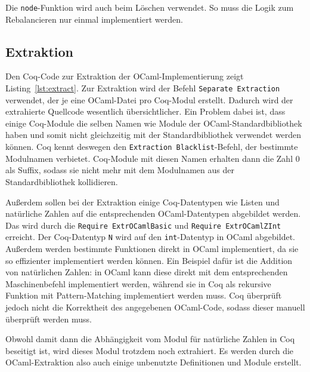 \documentclass[a4paper, parskip]{scrartcl}
\begin{document}
Die \verb|node|-Funktion wird auch beim Löschen verwendet.
So muss die Logik zum Rebalancieren nur einmal implementiert werden.

\subsection{Extraktion}

Den Coq-Code zur Extraktion der OCaml-Implementierung zeigt Listing~\ref{lst:extract}. 
Zur Extraktion wird der Befehl \verb|Separate Extraction| verwendet, der je eine OCaml-Datei pro Coq-Modul erstellt.
Dadurch wird der extrahierte Quellcode wesentlich übersichtlicher.
Ein Problem dabei ist, dass einige Coq-Module die selben Namen wie Module der OCaml-Standardbibliothek haben und somit nicht gleichzeitig mit der Standardbibliothek verwendet werden können.
Coq kennt deswegen den \verb|Extraction Blacklist|-Befehl, der bestimmte Modulnamen verbietet.
Coq-Module mit diesen Namen erhalten dann die Zahl 0 als Suffix, sodass sie nicht mehr mit dem Modulnamen aus der Standardbibliothek kollidieren.

Außerdem sollen bei der Extraktion einige Coq-Datentypen wie Listen und natürliche Zahlen auf die entsprechenden OCaml-Datentypen abgebildet werden.
Das wird durch die \verb|Require ExtrOCamlBasic| und \verb|Require ExtrOCamlZInt| erreicht. Der Coq-Datentyp \verb|N| wird auf den \verb|int|-Datentyp in OCaml abgebildet.
Außerdem werden bestimmte Funktionen direkt in OCaml implementiert, da sie so effizienter implementiert werden können. 
Ein Beispiel dafür ist die Addition von natürlichen Zahlen: in OCaml kann diese direkt mit dem entsprechenden Maschinenbefehl implementiert werden, während sie in Coq als rekursive Funktion mit Pattern-Matching implementiert werden muss. Coq überprüft jedoch nicht die Korrektheit des angegebenen OCaml-Code, sodass dieser manuell überprüft werden muss. 

Obwohl damit dann die Abhängigkeit vom Modul für natürliche Zahlen in Coq beseitigt ist, wird dieses Modul trotzdem noch extrahiert. Es werden durch die OCaml-Extraktion also auch einige unbenutzte Definitionen und Module erstellt.
\end{document}
